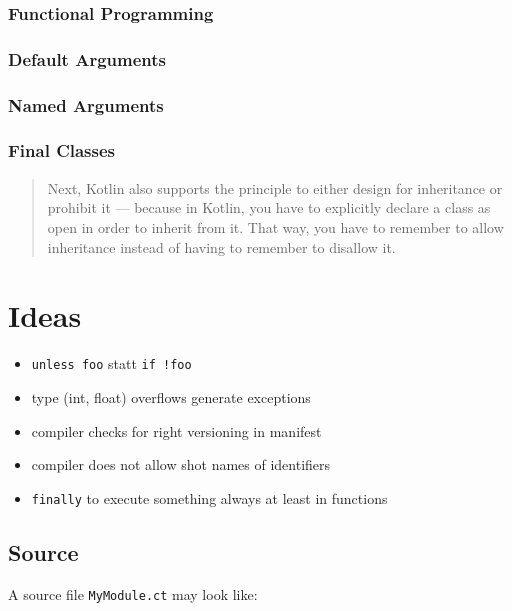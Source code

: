 \documentclass[a4paper,12pt]{article}
\begin{document}
\subsubsection{Functional Programming}

\subsubsection{Default Arguments}

\subsubsection{Named Arguments}

\subsubsection{Final Classes}

\begin{quotation}
Next, Kotlin also supports the principle to either design for inheritance or prohibit it — because in Kotlin, you have to explicitly declare a class as open in order to inherit from it. That way, you have to remember to allow inheritance instead of having to remember to disallow it.\cite{kotlin-sommerhoff}
\end{quotation}

\section{Ideas}

\begin{itemize}
    \item \verb|unless foo| statt \verb|if !foo|
    \item type (int, float) overflows generate exceptions
    \item compiler checks for right versioning in manifest
    \item compiler does not allow shot names of identifiers
    \item \verb|finally| to execute something always at least in functions
\end{itemize}

\subsection{Source}

A source file \verb|MyModule.ct| may look like:
\end{document}
